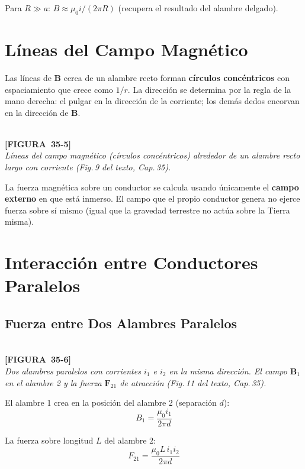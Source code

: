 \documentclass[12pt, letterpaper]{report}
\numberwithin{equation}{section}
\newcommand{\vB}[1]{\boldsymbol{#1}}          %
\newcommand{\figplaceholder}[2]{%
  \begin{tcolorbox}[figbox]
    \centering
    \textcolor{NavyBlue!50}{\rule{0pt}{2.8cm}}\\[4pt]
    {\small\color{NavyBlue}\textbf{[FIGURA\ #1]}\\[2pt]
    \textit{#2}}
  \end{tcolorbox}
}
\begin{document}
Para $R\gg a$: $B\approx\mu_0 i/(2\pi R)$ (recupera el resultado del
alambre delgado).

\section{Líneas del Campo Magnético}

Las líneas de $\vB{B}$ cerca de un alambre recto forman
\textbf{círculos concéntricos} con espaciamiento que crece como $1/r$.
La dirección se determina por la regla de la mano derecha: el pulgar en
la dirección de la corriente; los demás dedos encorvan en la dirección
de $\vB{B}$.

\figplaceholder{35-5}{Líneas del campo magnético (círculos concéntricos)
alrededor de un alambre recto largo con corriente
(Fig.\,9 del texto, Cap.\,35).}

\begin{tcolorbox}[notebox, title=Principio para calcular fuerzas]
  La fuerza magnética sobre un conductor se calcula usando únicamente el
  \textbf{campo externo} en que está inmerso. El campo que el propio
  conductor genera no ejerce fuerza sobre sí mismo (igual que la gravedad
  terrestre no actúa sobre la Tierra misma).
\end{tcolorbox}

\section{Interacción entre Conductores Paralelos}

\subsection{Fuerza entre Dos Alambres Paralelos}

\figplaceholder{35-6}{Dos alambres paralelos con corrientes $i_1$ e $i_2$
en la misma dirección. El campo $\vB{B}_1$ en el alambre 2 y la fuerza
$\vB{F}_{21}$ de atracción (Fig.\,11 del texto, Cap.\,35).}

El alambre 1 crea en la posición del alambre 2 (separación $d$):
\[
  B_1 = \frac{\mu_0 i_1}{2\pi d}
\]

La fuerza sobre longitud $L$ del alambre 2:
\begin{equation}
  \boxed{F_{21} = \frac{\mu_0 L\, i_1 i_2}{2\pi d}}
  \label{eq:Fparalelos}
\end{equation}
\end{document}

